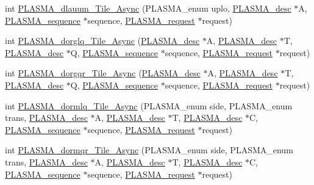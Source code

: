\begin{DoxyCompactItemize}
\item 
int \hyperlink{group__double__Tile__Async_ga454e1aaca3decd20aabaefd5a0a2b5a4_ga454e1aaca3decd20aabaefd5a0a2b5a4}{P\+L\+A\+S\+M\+A\+\_\+dlauum\+\_\+\+Tile\+\_\+\+Async} (P\+L\+A\+S\+M\+A\+\_\+enum uplo, \hyperlink{structplasma__desc__t}{P\+L\+A\+S\+M\+A\+\_\+desc} $\ast$A, \hyperlink{structplasma__sequence__t}{P\+L\+A\+S\+M\+A\+\_\+sequence} $\ast$sequence, \hyperlink{structplasma__request__t}{P\+L\+A\+S\+M\+A\+\_\+request} $\ast$request)
\item 
int \hyperlink{group__double__Tile__Async_gabed8ba0d34beb4116381467d5de805f8_gabed8ba0d34beb4116381467d5de805f8}{P\+L\+A\+S\+M\+A\+\_\+dorglq\+\_\+\+Tile\+\_\+\+Async} (\hyperlink{structplasma__desc__t}{P\+L\+A\+S\+M\+A\+\_\+desc} $\ast$A, \hyperlink{structplasma__desc__t}{P\+L\+A\+S\+M\+A\+\_\+desc} $\ast$T, \hyperlink{structplasma__desc__t}{P\+L\+A\+S\+M\+A\+\_\+desc} $\ast$Q, \hyperlink{structplasma__sequence__t}{P\+L\+A\+S\+M\+A\+\_\+sequence} $\ast$sequence, \hyperlink{structplasma__request__t}{P\+L\+A\+S\+M\+A\+\_\+request} $\ast$request)
\item 
int \hyperlink{group__double__Tile__Async_gaab79417822b069ee12f434beaec61420_gaab79417822b069ee12f434beaec61420}{P\+L\+A\+S\+M\+A\+\_\+dorgqr\+\_\+\+Tile\+\_\+\+Async} (\hyperlink{structplasma__desc__t}{P\+L\+A\+S\+M\+A\+\_\+desc} $\ast$A, \hyperlink{structplasma__desc__t}{P\+L\+A\+S\+M\+A\+\_\+desc} $\ast$T, \hyperlink{structplasma__desc__t}{P\+L\+A\+S\+M\+A\+\_\+desc} $\ast$Q, \hyperlink{structplasma__sequence__t}{P\+L\+A\+S\+M\+A\+\_\+sequence} $\ast$sequence, \hyperlink{structplasma__request__t}{P\+L\+A\+S\+M\+A\+\_\+request} $\ast$request)
\item 
int \hyperlink{group__double__Tile__Async_gab1421be17b653db9ff4aa7be056bdbfc_gab1421be17b653db9ff4aa7be056bdbfc}{P\+L\+A\+S\+M\+A\+\_\+dormlq\+\_\+\+Tile\+\_\+\+Async} (P\+L\+A\+S\+M\+A\+\_\+enum side, P\+L\+A\+S\+M\+A\+\_\+enum trans, \hyperlink{structplasma__desc__t}{P\+L\+A\+S\+M\+A\+\_\+desc} $\ast$A, \hyperlink{structplasma__desc__t}{P\+L\+A\+S\+M\+A\+\_\+desc} $\ast$T, \hyperlink{structplasma__desc__t}{P\+L\+A\+S\+M\+A\+\_\+desc} $\ast$C, \hyperlink{structplasma__sequence__t}{P\+L\+A\+S\+M\+A\+\_\+sequence} $\ast$sequence, \hyperlink{structplasma__request__t}{P\+L\+A\+S\+M\+A\+\_\+request} $\ast$request)
\item 
int \hyperlink{group__double__Tile__Async_gad81be953f0dbe79b96924f573f28ec15_gad81be953f0dbe79b96924f573f28ec15}{P\+L\+A\+S\+M\+A\+\_\+dormqr\+\_\+\+Tile\+\_\+\+Async} (P\+L\+A\+S\+M\+A\+\_\+enum side, P\+L\+A\+S\+M\+A\+\_\+enum trans, \hyperlink{structplasma__desc__t}{P\+L\+A\+S\+M\+A\+\_\+desc} $\ast$A, \hyperlink{structplasma__desc__t}{P\+L\+A\+S\+M\+A\+\_\+desc} $\ast$T, \hyperlink{structplasma__desc__t}{P\+L\+A\+S\+M\+A\+\_\+desc} $\ast$C, \hyperlink{structplasma__sequence__t}{P\+L\+A\+S\+M\+A\+\_\+sequence} $\ast$sequence, \hyperlink{structplasma__request__t}{P\+L\+A\+S\+M\+A\+\_\+request} $\ast$request)

\end{DoxyCompactItemize}
